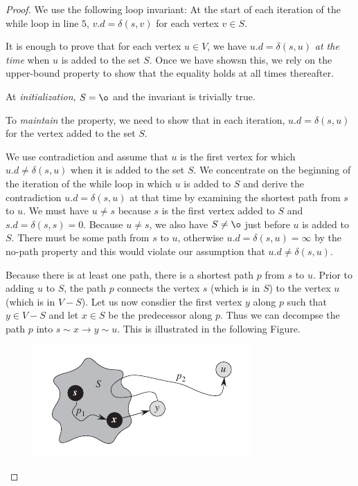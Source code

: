 \begin{proof} We use the following loop invariant: At the start of each iteration of the while loop in line $5$, $v.d = \delta(s,v)$ for each vertex $v \in S$.

  It is enough to prove that for each vertex $u \in V$, we have $u.d = \delta(s,u)$ \emph{at the time} when $u$ is added to the set $S$. Once we have showsn this, we rely on the upper-bound property to show that the equality holds at all times thereafter.

  At \emph{initialization}, $S = \o$ and the invariant is trivially true.

  To \emph{maintain} the property, we need to show that in each iteration, $u.d = \delta(s,u)$ for the vertex added to the set $S$.

  We use contradiction and assume that $u$ is the first vertex for which $u.d \neq \delta(s,u)$ when it is added to the set $S$. We concentrate on the beginning of the iteration of the while loop in which $u$ is added to $S$ and derive the contradiction $u.d = \delta(s,u)$ at that time by examining the shortest path from $s$ to $u$. We must have $u \neq s$ because $s$ is the first vertex added to $S$ and $s.d = \delta(s,s) = 0$. Because $u \neq s$, we also have $S \neq \o$ just before $u$ is added to $S$. There must be some path from $s$ to $u$, otherwise $u.d = \delta(s,u) = \infty$ by the no-path property and this would violate our assumption that $u.d \neq \delta(s,u)$.

  Because there is at least one path, there is a shortest path $p$ from $s$ to $u$. Prior to adding $u$ to $S$, the path $p$ connects the vertex $s$ (which is in $S$) to the vertex $u$ (which is in $V-S$). Let us now consdier the first vertex $y$ along $p$ such that $y \in V-S$ and let $x \in S$ be the predecessor along $p$. Thus we can decompse the path $p$ into $s \sim x \rightarrow y \sim u$. This is illustrated in the following Figure.

  \begin{figure}[H]
    \centering
    \includegraphics[scale=0.5]{images/sssp_3_1.png}
  \end{figure}
  

\end{proof}
